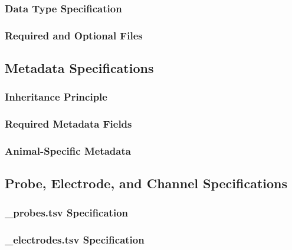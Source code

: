 \documentclass[fleqn,10pt]{wlscirep}
\begin{document}
\subsubsection*{Data Type Specification}

\subsubsection*{Required and Optional Files}

\subsection*{Metadata Specifications}

\subsubsection*{Inheritance Principle}

\subsubsection*{Required Metadata Fields}

\subsubsection*{Animal-Specific Metadata}

\subsection*{Probe, Electrode, and Channel Specifications}

\subsubsection*{_probes.tsv Specification}

\subsubsection*{_electrodes.tsv Specification}
\end{document}
